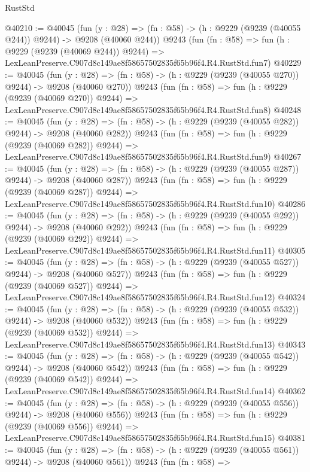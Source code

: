 \begin{lexlean}{RustStd}
\begin{coremodule}
@40210 := @40045
    (fun (y : @28) => (fn : @58) -> (h : @9229 (@9239 (@40055 @244)) @9244) -> @9208 (@40060 @244))
    @9243
    (fun (fn : @58) =>
    fun (h : @9229 (@9239 (@40069 @244)) @9244) =>
    LexLeanPreserve.C907d8c149ae8f58657502835f65b96f4.R4.RustStd.fun7)
@40229 := @40045
    (fun (y : @28) => (fn : @58) -> (h : @9229 (@9239 (@40055 @270)) @9244) -> @9208 (@40060 @270))
    @9243
    (fun (fn : @58) =>
    fun (h : @9229 (@9239 (@40069 @270)) @9244) =>
    LexLeanPreserve.C907d8c149ae8f58657502835f65b96f4.R4.RustStd.fun8)
@40248 := @40045
    (fun (y : @28) => (fn : @58) -> (h : @9229 (@9239 (@40055 @282)) @9244) -> @9208 (@40060 @282))
    @9243
    (fun (fn : @58) =>
    fun (h : @9229 (@9239 (@40069 @282)) @9244) =>
    LexLeanPreserve.C907d8c149ae8f58657502835f65b96f4.R4.RustStd.fun9)
@40267 := @40045
    (fun (y : @28) => (fn : @58) -> (h : @9229 (@9239 (@40055 @287)) @9244) -> @9208 (@40060 @287))
    @9243
    (fun (fn : @58) =>
    fun (h : @9229 (@9239 (@40069 @287)) @9244) =>
    LexLeanPreserve.C907d8c149ae8f58657502835f65b96f4.R4.RustStd.fun10)
@40286 := @40045
    (fun (y : @28) => (fn : @58) -> (h : @9229 (@9239 (@40055 @292)) @9244) -> @9208 (@40060 @292))
    @9243
    (fun (fn : @58) =>
    fun (h : @9229 (@9239 (@40069 @292)) @9244) =>
    LexLeanPreserve.C907d8c149ae8f58657502835f65b96f4.R4.RustStd.fun11)
@40305 := @40045
    (fun (y : @28) => (fn : @58) -> (h : @9229 (@9239 (@40055 @527)) @9244) -> @9208 (@40060 @527))
    @9243
    (fun (fn : @58) =>
    fun (h : @9229 (@9239 (@40069 @527)) @9244) =>
    LexLeanPreserve.C907d8c149ae8f58657502835f65b96f4.R4.RustStd.fun12)
@40324 := @40045
    (fun (y : @28) => (fn : @58) -> (h : @9229 (@9239 (@40055 @532)) @9244) -> @9208 (@40060 @532))
    @9243
    (fun (fn : @58) =>
    fun (h : @9229 (@9239 (@40069 @532)) @9244) =>
    LexLeanPreserve.C907d8c149ae8f58657502835f65b96f4.R4.RustStd.fun13)
@40343 := @40045
    (fun (y : @28) => (fn : @58) -> (h : @9229 (@9239 (@40055 @542)) @9244) -> @9208 (@40060 @542))
    @9243
    (fun (fn : @58) =>
    fun (h : @9229 (@9239 (@40069 @542)) @9244) =>
    LexLeanPreserve.C907d8c149ae8f58657502835f65b96f4.R4.RustStd.fun14)
@40362 := @40045
    (fun (y : @28) => (fn : @58) -> (h : @9229 (@9239 (@40055 @556)) @9244) -> @9208 (@40060 @556))
    @9243
    (fun (fn : @58) =>
    fun (h : @9229 (@9239 (@40069 @556)) @9244) =>
    LexLeanPreserve.C907d8c149ae8f58657502835f65b96f4.R4.RustStd.fun15)
@40381 := @40045
    (fun (y : @28) => (fn : @58) -> (h : @9229 (@9239 (@40055 @561)) @9244) -> @9208 (@40060 @561))
    @9243
    (fun (fn : @58) =>

\end{coremodule}
\end{lexlean}
